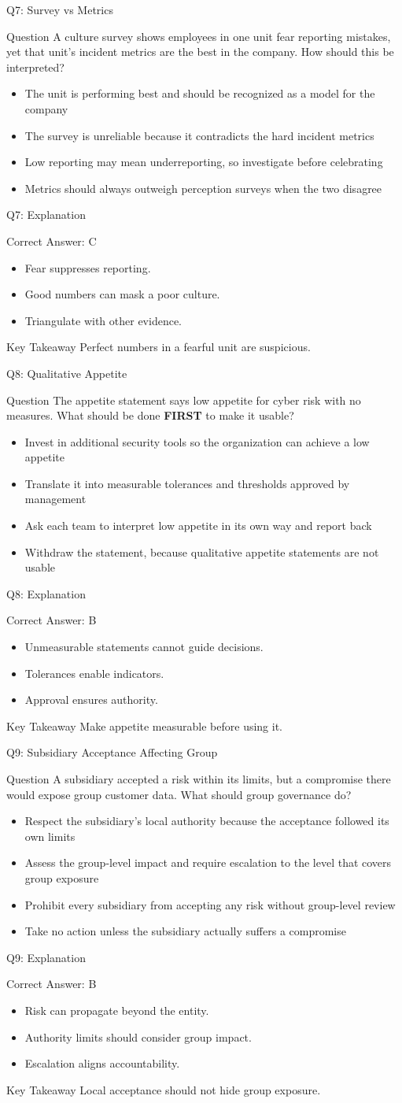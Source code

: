 \documentclass[aspectratio=169]{beamer}
\newcommand{\hq}[7]{%
	\begin{frame}{Q#1: #2}
		\begin{block}{Question}
			#3
		\end{block}
		\begin{itemize}
			#4
		\end{itemize}
	\end{frame}
	\begin{frame}{Q#1: Explanation}
		\begin{block}{Correct Answer: #5}
			\begin{itemize}
				#6
			\end{itemize}
		\end{block}
		\begin{alertblock}{Key Takeaway}
			#7
		\end{alertblock}
	\end{frame}
}
\begin{document}
	\hq{7}{Survey vs Metrics}
	{A culture survey shows employees in one unit fear reporting mistakes, yet that unit's incident metrics are the best in the company. How should this be interpreted?}
	{\item[\textbf{(A)}] The unit is performing best and should be recognized as a model for the company
		\item[\textbf{(B)}] The survey is unreliable because it contradicts the hard incident metrics
		\item[\textbf{(C)}] Low reporting may mean underreporting, so investigate before celebrating
		\item[\textbf{(D)}] Metrics should always outweigh perception surveys when the two disagree}
	{C}
	{\item Fear suppresses reporting.
		\item Good numbers can mask a poor culture.
		\item Triangulate with other evidence.}
	{Perfect numbers in a fearful unit are suspicious.}

	\hq{8}{Qualitative Appetite}
	{The appetite statement says low appetite for cyber risk with no measures. What should be done \textbf{FIRST} to make it usable?}
	{\item[\textbf{(A)}] Invest in additional security tools so the organization can achieve a low appetite
		\item[\textbf{(B)}] Translate it into measurable tolerances and thresholds approved by management
		\item[\textbf{(C)}] Ask each team to interpret low appetite in its own way and report back
		\item[\textbf{(D)}] Withdraw the statement, because qualitative appetite statements are not usable}
	{B}
	{\item Unmeasurable statements cannot guide decisions.
		\item Tolerances enable indicators.
		\item Approval ensures authority.}
	{Make appetite measurable before using it.}

	\hq{9}{Subsidiary Acceptance Affecting Group}
	{A subsidiary accepted a risk within its limits, but a compromise there would expose group customer data. What should group governance do?}
	{\item[\textbf{(A)}] Respect the subsidiary's local authority because the acceptance followed its own limits
		\item[\textbf{(B)}] Assess the group-level impact and require escalation to the level that covers group exposure
		\item[\textbf{(C)}] Prohibit every subsidiary from accepting any risk without group-level review
		\item[\textbf{(D)}] Take no action unless the subsidiary actually suffers a compromise}
	{B}
	{\item Risk can propagate beyond the entity.
		\item Authority limits should consider group impact.
		\item Escalation aligns accountability.}
	{Local acceptance should not hide group exposure.}
\end{document}
